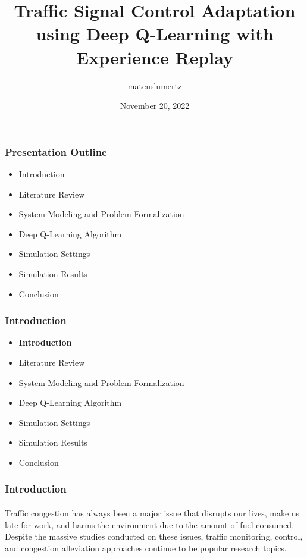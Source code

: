 \documentclass[aspectratio=169]{beamer}
\author{mateuslumertz}
\title[TSC Adaptation using Deep Q-Learning]{Traffic Signal Control Adaptation using Deep
Q-Learning with Experience Replay
}
\date{November 20, 2022}
\begin{document}
\begin{frame}[plain]
\maketitle
\end{frame}




\begin{frame}
\frametitle{Presentation Outline}

\begin{itemize}
  \item Introduction
  \item  Literature Review
  \item System Modeling and Problem Formalization
  \item Deep Q-Learning Algorithm
  \item Simulation Settings
  \item Simulation Results
  \item Conclusion
\end{itemize}

\end{frame}
\begin{frame}
\frametitle{Introduction}
\begin{itemize}
  \item {\color{cor1}\textbf{Introduction}}
  \item  Literature Review
  \item System Modeling and Problem Formalization
  \item Deep Q-Learning Algorithm
  \item Simulation Settings
  \item Simulation Results
  \item Conclusion
\end{itemize}

\end{frame}
\begin{frame}
\frametitle{Introduction}
\framesubtitle{}

Traffic congestion has always been a major issue that
disrupts our lives, make us late for work, and harms the
environment due to the amount of fuel consumed. Despite the
massive studies conducted on these issues, traffic monitoring,
control, and congestion alleviation approaches continue to be
popular research topics.

\end{frame}
\end{document}
